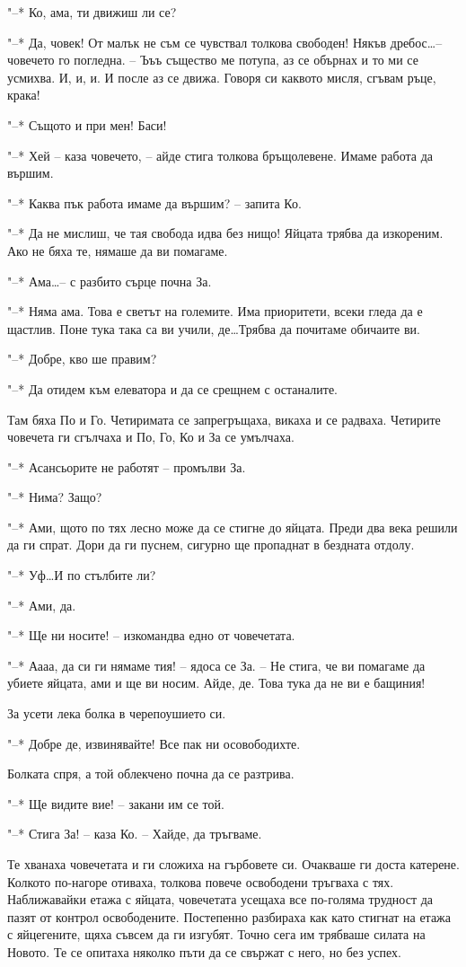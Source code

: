 \documentclass[ebook,openany,12pt]{memoir}
\begin{document}
"--* Ко, ама, ти движиш ли се?

"--* Да, човек! От малък не съм се чувствал толкова свободен! Някъв дребос\ldots – човечето го погледна. – Ъъъ същество ме потупа, аз се обърнах и то ми се усмихва. И, и, и. И после аз се движа. Говоря си каквото мисля, сгъвам ръце, крака!

"--* Същото и при мен! Баси!

"--* Хей -- каза човечето, – айде стига толкова бръщолевене. Имаме работа да вършим.

"--* Каква пък работа имаме да вършим? – запита Ко.

"--* Да не мислиш, че тая свобода идва без нищо! Яйцата трябва да изкореним. Ако не бяха те, нямаше да ви помагаме.

"--* Ама\ldots – с разбито сърце почна За.

"--* Няма ама. Това е светът на големите. Има приоритети, всеки гледа да е щастлив. Поне тука така са ви учили, де\ldots Трябва да почитаме обичаите ви.

"--* Добре, кво ше правим?

"--* Да отидем към елеватора и да се срещнем с останалите.

Там бяха По и Го. Четиримата се запрегръщаха, викаха и се радваха. Четирите човечета ги сгълчаха и По, Го, Ко и За се умълчаха.

"--* Асансьорите не работят – промълви За.

"--* Нима? Защо?

"--* Ами, щото по тях лесно може да се стигне до яйцата. Преди два века решили да ги спрат. Дори да ги пуснем, сигурно ще пропаднат в бездната отдолу.

"--* Уф\ldots И по стълбите ли?

"--* Ами, да.

"--* Ще ни носите! – изкомандва едно от човечетата.

"--* Аааа, да си ги нямаме тия! – ядоса се За. – Не стига, че ви помагаме да убиете яйцата, ами и ще ви носим. Айде, де. Това тука да не ви е бащиния!

За усети лека болка в черепоушието си.

"--* Добре де, извинявайте! Все пак ни осовободихте.

Болката спря, а той облекчено почна да се разтрива.

"--* Ще видите вие! – закани им се той.

"--* Стига За! – каза Ко. – Хайде, да тръгваме.

Те хванаха човечетата и ги сложиха на гърбовете си. Очакваше ги доста катерене. Колкото по-нагоре отиваха, толкова повече освободени тръгваха с тях. Наближавайки етажа с яйцата, човечетата усещаха все по-голяма трудност да пазят от контрол освободените. Постепенно разбираха как като стигнат на етажа с яйцегените, щяха съвсем да ги изгубят. Точно сега им трябваше силата на Новото. Те се опитаха няколко пъти да се свържат с него, но без успех.
\end{document}

